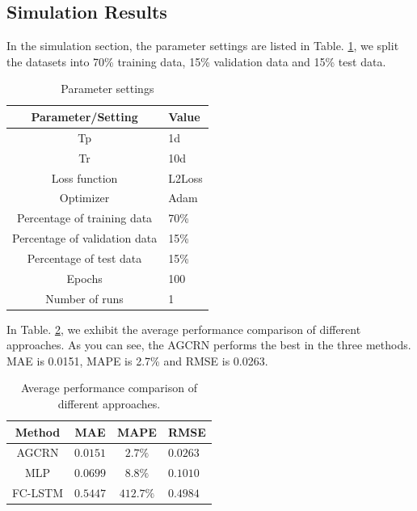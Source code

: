 \documentclass[sigconf, authordraft]{acmart}
\begin{document}
	\subsection{Simulation Results}
	In the simulation section, the parameter settings are listed in Table.
	\ref{Parameter settings }, we split the datasets into 70\% training data, 15\%
	validation data and 15\% test data.

	\begin{table}
		\caption{Parameter settings }
		\label{Parameter settings }
		\begin{tabular}{cl}
			\toprule Parameter/Setting    & Value  \\
			\midrule Tp                   & 1d     \\
			Tr                            & 10d    \\
			Loss function                 & L2Loss \\
			Optimizer                     & Adam   \\
			Percentage of training data   & 70\%   \\
			Percentage of validation data & 15\%   \\
			Percentage of test data       & 15\%   \\
			Epochs                        & 100    \\
			Number of runs                & 1      \\
			\bottomrule
		\end{tabular}
	\end{table}

	In Table. \ref{Average performance}, we exhibit the average performance
	comparison of different approaches. As you can see, the AGCRN performs the
	best in the three methods. MAE is 0.0151, MAPE is 2.7\% and RMSE is 0.0263.

	\begin{table}
		\caption{Average performance comparison of different approaches.}
		\label{Average performance}
		\begin{tabular}{cccl}
			\toprule Method & MAE      & MAPE      & RMSE     \\
			\midrule AGCRN  & $0.0151$ & $2.7\%$   & $0.0263$ \\
			MLP             & $0.0699$ & $8.8\%$   & $0.1010$ \\
			FC-LSTM         & $0.5447$ & $412.7\%$ & $0.4984$ \\
			\bottomrule
		\end{tabular}
	\end{table}
\end{document}

